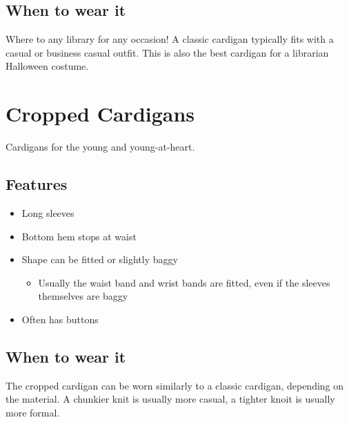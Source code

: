 \documentclass[
  openany]{book}
\providecommand{\tightlist}{%
  \setlength{\itemsep}{0pt}\setlength{\parskip}{0pt}}
\begin{document}
\hypertarget{when-to-wear-it}{%
\section{When to wear it}\label{when-to-wear-it}}

Where to any library for any occasion! A classic cardigan typically fits with a casual or business casual outfit. This is also the best cardigan for a librarian Halloween costume.

\hypertarget{cropped-cardigans}{%
\chapter{Cropped Cardigans}\label{cropped-cardigans}}

Cardigans for the young and young-at-heart.

\hypertarget{features-1}{%
\section{Features}\label{features-1}}

\begin{itemize}
\tightlist
\item
  Long sleeves
\item
  Bottom hem stops at waist
\item
  Shape can be fitted or slightly baggy

  \begin{itemize}
  \tightlist
  \item
    Usually the waist band and wrist bands are fitted, even if the sleeves themselves are baggy
  \end{itemize}
\item
  Often has buttons
\end{itemize}

\hypertarget{when-to-wear-it-1}{%
\section{When to wear it}\label{when-to-wear-it-1}}

The cropped cardigan can be worn similarly to a classic cardigan, depending on the material. A chunkier knit is usually more casual, a tighter knoit is usually more formal.
\end{document}
